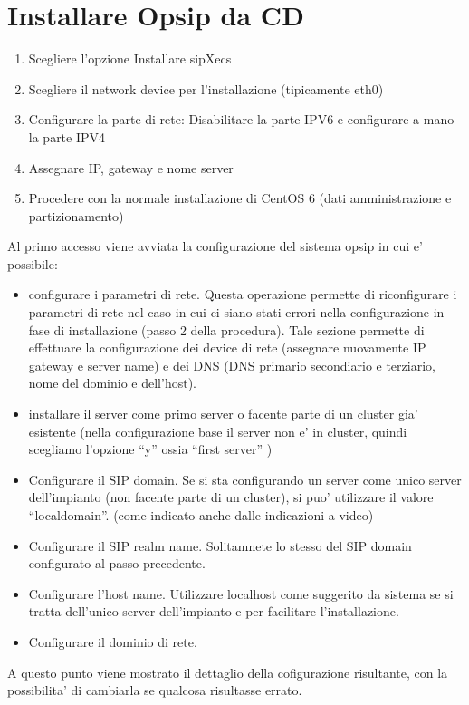 \section{Installare Opsip da CD}

\begin{enumerate}
\item Scegliere l'opzione Installare sipXecs

\item Scegliere il network device per l'installazione (tipicamente eth0)

\item Configurare la parte di rete: Disabilitare la parte IPV6 e configurare a mano la parte IPV4

\item Assegnare IP, gateway e nome server

\item Procedere con la normale installazione di CentOS 6 (dati amministrazione e partizionamento)
\end{enumerate}

Al primo accesso viene avviata la configurazione del sistema opsip in cui e' possibile:

\begin{itemize}
\item configurare i parametri di rete. Questa operazione permette di riconfigurare i parametri di rete nel caso in cui ci siano stati errori nella configurazione in fase di installazione (passo 2 della procedura). Tale sezione permette di effettuare la configurazione dei device di rete (assegnare nuovamente IP gateway e server name) e dei DNS (DNS primario secondiario e terziario, nome del dominio e dell'host).

\item installare il server come primo server o facente parte di un cluster gia' esistente (nella configurazione base il server non e' in cluster, quindi scegliamo l'opzione ``y'' ossia ``first server'' )

\item Configurare il SIP domain. Se si sta configurando un server come unico server dell'impianto (non facente parte di un cluster), si puo' utilizzare il valore ``localdomain''. (come indicato anche dalle indicazioni a video)

\item Configurare il SIP realm name. Solitamnete lo stesso del SIP domain configurato al passo precedente.

\item Configurare l'host name. Utilizzare localhost come suggerito da sistema se si tratta dell'unico server dell'impianto e per facilitare l'installazione.

\item Configurare il dominio di rete.
\end{itemize}

A questo punto viene mostrato il dettaglio della cofigurazione risultante, con la possibilita' di cambiarla se qualcosa risultasse errato.
